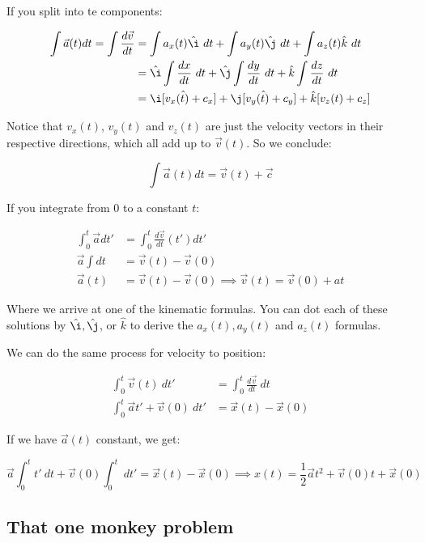 \documentclass{article}
\theoremstyle{definition}
\numberwithin{equation}{section}
\numberwithin{definition}{section}
\begin{document}
If you split into te components:

\begin{align*}
	\int \vec a(t) dt = \int \frac{d\vec v}{dt} &=	\int a_x(t)\hat{\i} \  dt + \int a_y(t) \hat \j  \ dt+ \int a_z(t) \hat k  \ dt\\
	&= \hat \i \int \frac{dx}{dt} \  dt + \hat \j \int \frac{dy}{dt} \ dt + \hat k \int \frac{dz}{dt}\  dt \\
	&= \hat \i [v_x(t) + c_x] + \hat \j [v_y(t) + c_y] + \hat k [v_z(t) + c_z]
\end{align*}

Notice that $v_x(t)$, $v_y(t)$ and $v_z(t)$ are just the velocity vectors in their respective directions, which all add up to $\vec{v}(t)$. So we conclude:

\[ \int \vec a(t) dt = \vec{v}(t) + \vec{c}\]

\begin{remark}  
	If you integrate from $0$ to a constant $t$:
	
	\begin{align*}
		 \int_0^t \vec a dt' &= \int_0^t \frac{d \vec v}{dt} (t') dt'\\
		 \vec a \int dt  &= \vec v(t) - \vec v(0)\\ 
		 \vec a(t) &= \vec v(t) - \vec v(0) \implies \vec v(t) = \vec v(0) + at
		 \end{align*}
	 
	 Where we arrive at one of the kinematic formulas. You can dot each of these solutions by $\hat \i, \hat \j$, or $\hat k$ to derive the $a_x(t), a_y(t)$ and $a_z(t)$ formulas.
	
	
	We can do the same process for velocity to position:
	
	\begin{align*}
		\int_0^t  \vec v(t) \ dt' &= \int_0^t \frac{d \vec v}{dt} \ dt \\
		\int_0^t \vec a t' + \vec v(0) \ dt' &= \vec x(t) - \vec x(0)
	\end{align*}

	If we have $\vec a(t)$ constant, we get: 
	
	\[ \vec a \int_0^t t' \ dt + \vec v(0) \int_0^t \ dt' = \vec x(t) - \vec x(0) \implies x(t) = \frac{1}{2}\vec at^2 + \vec v(0)t + \vec x(0)\]
	\end{remark}

\subsection{That one monkey problem}
\end{document}
